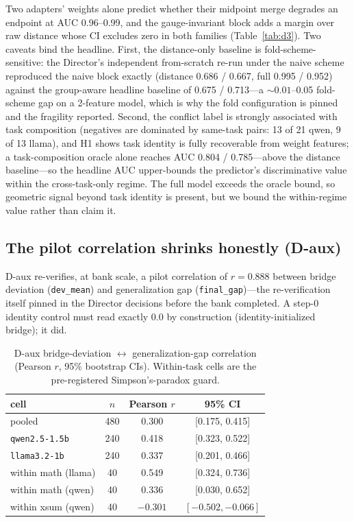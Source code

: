 \documentclass[10pt]{article}
\begin{document}
Two adapters' weights alone predict whether their midpoint merge degrades
an endpoint at AUC 0.96--0.99, and the gauge-invariant block adds a margin
over raw distance whose CI excludes zero in both families
(Table~\ref{tab:d3}). Two caveats bind the headline. First, the
distance-only baseline is fold-scheme-sensitive: the Director's independent
from-scratch re-run under the naive scheme reproduced the naive block
exactly (distance 0.686 / 0.667, full 0.995 / 0.952) against the
group-aware headline baseline of 0.675 / 0.713---a ${\sim}0.01$--0.05
fold-scheme gap on a 2-feature model, which is why the fold configuration
is pinned and the fragility reported. Second, the conflict label is
strongly associated with task composition (negatives are dominated by
same-task pairs: 13 of 21 qwen, 9 of 13 llama), and H1 shows task identity
is fully recoverable from weight features; a task-composition oracle alone
reaches AUC 0.804 / 0.785---above the distance baseline---so the headline
AUC upper-bounds the predictor's discriminative value within the
cross-task-only regime. The full model exceeds the oracle bound, so
geometric signal beyond task identity is present, but we bound the
within-regime value rather than claim it.

\subsection{The pilot correlation shrinks honestly (D-aux)}
\label{sec:daux}

D-aux re-verifies, at bank scale, a pilot correlation of $r = 0.888$
between bridge deviation (\texttt{dev\_mean}) and generalization gap
(\texttt{final\_gap})---the re-verification itself pinned in the Director
decisions before the bank completed. A step-0 identity control must read
exactly 0.0 by construction (identity-initialized bridge); it did.

\begin{table}[ht]
\centering
\caption{D-aux bridge-deviation $\leftrightarrow$ generalization-gap
correlation (Pearson $r$, 95\% bootstrap CIs). Within-task cells are the
pre-registered Simpson's-paradox guard.}
\label{tab:daux}
\begin{tabular}{lccc}
\toprule
cell & $n$ & Pearson $r$ & 95\% CI \\
\midrule
pooled & 480 & 0.300 & [0.175, 0.415] \\
\texttt{qwen2.5-1.5b} & 240 & 0.418 & [0.323, 0.522] \\
\texttt{llama3.2-1b} & 240 & 0.337 & [0.201, 0.466] \\
within math (llama) & 40 & 0.549 & [0.324, 0.736] \\
within math (qwen) & 40 & 0.336 & [0.030, 0.652] \\
within xsum (qwen) & 40 & $-0.301$ & $[-0.502, -0.066]$ \\
\bottomrule
\end{tabular}
\end{table}
\end{document}
